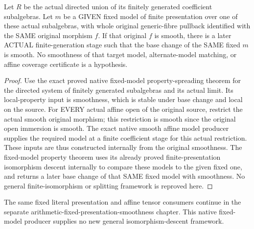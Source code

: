 \begin{theorem}
\label{thm:arithmetic-fixed-native-model-smooth-spreading}
\leanok
Let $R$ be the actual directed union of its finitely generated coefficient
subalgebras. Let $m$ be a GIVEN fixed model of finite presentation over one
of these actual subalgebras, with whole original generic-fibre pullback
identified with the SAME original morphism $f$. If that original $f$ is
smooth, there is a later ACTUAL finite-generation stage such that the
base change of the SAME fixed $m$ is smooth.
No smoothness of that target model, alternate-model matching, or affine
coverage certificate is a hypothesis.
\end{theorem}
\begin{proof}
Use the exact proved native fixed-model property-spreading theorem for the
directed system of finitely generated subalgebras and its actual limit.
Its local-property input is smoothness, which is stable under base change
and local on the source. For EVERY actual affine open of the original
source, restrict the actual smooth original morphism; this restriction is
smooth since the original open immersion is smooth. The exact native
smooth affine model producer supplies the required model at a finite
coefficient stage for this actual restriction. These inputs are thus
constructed internally from the original smoothness. The fixed-model
property theorem uses its already proved finite-presentation isomorphism
descent internally to compare these models to the given fixed one, and
returns a later base change of that SAME fixed model with smoothness.
No general finite-isomorphism or splitting framework is reproved here.
\end{proof}

The same fixed literal presentation and affine tensor consumers continue in
the separate arithmetic-fixed-presentation-smoothness chapter. This native
fixed-model producer supplies no new general isomorphism-descent framework.
